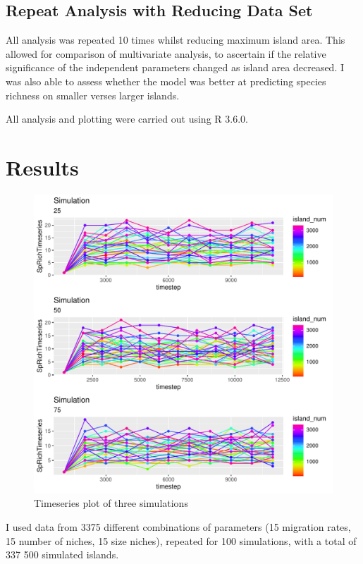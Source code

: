 \documentclass{article}
\begin{document}
\subsection{Repeat Analysis with Reducing Data Set}
All analysis was repeated 10 times whilst reducing maximum island area. This allowed for comparison of multivariate analysis, to ascertain if the relative significance of the independent parameters changed as island area decreased. I was also able to assess whether the model was better at predicting species richness on smaller verses larger islands.

All analysis and plotting were carried out using R 3.6.0.


\section{Results}

\begin{figure}
\centering
  \includegraphics[scale=0.5]{../../Results/Simulation/TimeseriesPlot.pdf}
  \caption{Timeseries plot of three simulations}
  \label{fig:Timeseries plot}
\end{figure}

I used data from 3375 different combinations of parameters (15 migration rates, 15 number of niches, 15 size niches), repeated for 100 simulations, with a total of 337 500 simulated islands. 
\end{document}
